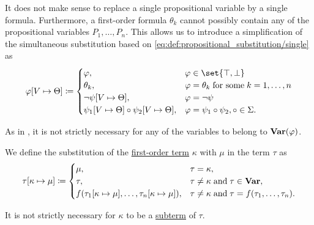 \begin{definition}
\begin{thmenum}
    It does not make sense to replace a single propositional variable by a single formula. Furthermore, a first-order formula \( \theta_k \) cannot possibly contain any of the propositional variables \( P_1, \ldots, P_n \). This allows us to introduce a simplification of the simultaneous substitution based on \eqref{eq:def:propositional_substitution/single} as
    \begin{equation}\label{eq:def:first_order_substitution/propositional}
      \varphi[V \mapsto \Theta] \coloneqq \begin{cases}
        \varphi,                                                    &\varphi \in \set{ \top, \bot } \\
        \theta_k,                                                   &\varphi = \theta_k \T{for some} k = 1, \ldots, n \\
        \neg \psi[V \mapsto \Theta],                                &\varphi = \neg \psi \\
        \psi_1[V \mapsto \Theta] \bincirc \psi_2[V \mapsto \Theta], &\varphi = \psi_1 \bincirc \psi_2, \bincirc \in \Sigma.
      \end{cases}
    \end{equation}

    As in , it is not strictly necessary for any of the variables to belong to \( \operatorname{\mathbf{Var}}(\varphi) \).

     We define the substitution of the \hyperref[def:first_order_syntax/term]{first-order term} \( \kappa \) with \( \mu \) in the term \( \tau \) as
    \begin{equation}\label{eq:def:first_order_substitution/term_in_term}
      \tau[\kappa \mapsto \mu] \coloneqq \begin{cases}
        \mu,                                                               &\tau = \kappa, \\
        \tau,                                                              &\tau \neq \kappa \T{and} \tau \in \boldop{Var}, \\
        f(\tau_1[\kappa \mapsto \mu], \ldots, \tau_n[\kappa \mapsto \mu]), &\tau \neq \kappa \T{and} \tau = f(\tau_1, \ldots, \tau_n).
      \end{cases}
    \end{equation}

    It is not strictly necessary for \( \kappa \) to be a \hyperref[def:first_order_syntax/subterm]{subterm} of \( \tau \).


\end{thmenum}
\end{definition}

